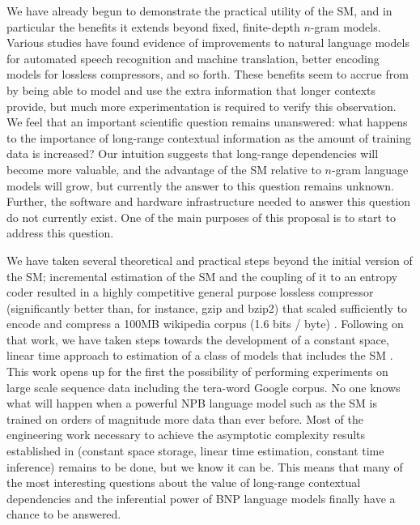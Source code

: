 \documentclass[10pt]{article}
\begin{document}
\begin{figure}[htbp]
\begin{center}
\label{default}
\end{center}
\end{figure}

We have already begun to demonstrate the practical utility of the SM, and in particular the benefits it extends beyond fixed, finite-depth $n$-gram models.  Various studies have found evidence of improvements to natural language models for automated speech recognition and machine translation, better encoding models for lossless compressors, and so forth.  These benefits seem to accrue from by being able to model and use the extra information that longer contexts provide, but much more experimentation is required to verify this observation.  We feel that an important scientific question remains unanswered: what happens to the importance of long-range contextual information as the amount of training data is increased?  Our intuition suggests that long-range dependencies will become more valuable, and the advantage of the SM relative to $n$-gram language models will grow, but currently the answer to this question remains unknown.   Further, the software and hardware infrastructure needed to answer this question do not currently exist.  One of the main purposes of this proposal is to start to address this question.

We have taken several theoretical and practical steps beyond the initial version of the SM; incremental estimation of the SM and the coupling of it to an entropy coder resulted in a highly competitive general purpose lossless compressor (significantly better than, for instance, gzip and bzip2) that scaled sufficiently to encode and compress a 100MB wikipedia corpus (1.6 bits / byte) \citep{Gasthaus2010}.  Following on that work, we have taken steps towards the development of a constant space, linear time approach to estimation of a class of models that includes the SM  \citep{Bartlett2010}.  This work  opens up for the first the possibility of performing experiments on large scale sequence data including the tera-word Google corpus.   No one knows what will happen when a powerful NPB language model such as the SM is trained on orders of magnitude more data than ever before.  Most of the engineering work necessary to achieve the asymptotic complexity results established in \citep{Bartlett2010} (constant space storage, linear time estimation, constant time inference) remains to be done, but we know it can be.  This means that many of the most interesting questions about the value of long-range contextual dependencies and the inferential power of BNP language models finally have a chance to be answered.
\end{document}
